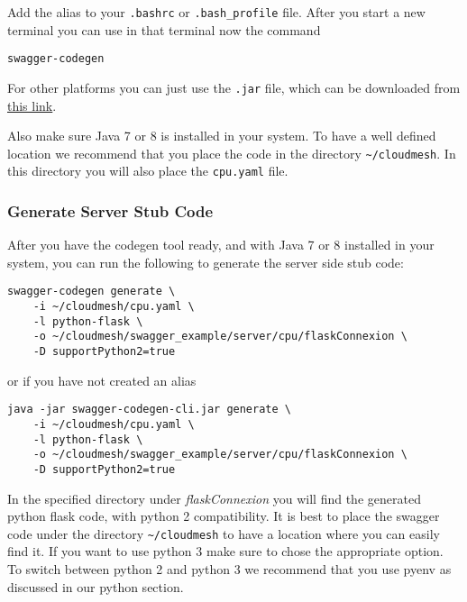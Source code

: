 Add the alias to your \verb|.bashrc| or \verb|.bash_profile| file. After you start a
new terminal you can use in that terminal now the command 

\begin{lstlisting}
swagger-codegen
\end{lstlisting}


For other platforms you can just use the \texttt{.jar} file, which can be downloaded
from
\href{https://oss.sonatype.org/content/repositories/releases/io/swagger/swagger-codegen-cli/2.3.1/swagger-codegen-cli-2.3.1.jar}{this
link}.

Also make sure Java 7 or 8 is installed in your system. To have a well
defined location we recommend that you place the code in the directory
\texttt{\textasciitilde{}/cloudmesh}. In this directory you will also
place the \texttt{cpu.yaml} file.

\subsubsection{Generate Server Stub
Code}\label{generate-server-stub-code}

After you have the codegen tool ready, and with Java 7 or 8 installed in
your system, you can run the following to generate the server side stub
code:

\begin{lstlisting}
swagger-codegen generate \
    -i ~/cloudmesh/cpu.yaml \
    -l python-flask \
    -o ~/cloudmesh/swagger_example/server/cpu/flaskConnexion \
    -D supportPython2=true
\end{lstlisting}

or if you have not created an alias 

\begin{lstlisting}
java -jar swagger-codegen-cli.jar generate \
    -i ~/cloudmesh/cpu.yaml \
    -l python-flask \
    -o ~/cloudmesh/swagger_example/server/cpu/flaskConnexion \
    -D supportPython2=true
\end{lstlisting}



In the specified directory under \emph{flaskConnexion} you will find the
generated python flask code, with python 2 compatibility. It is best to
place the swagger code under the directory \verb|~/cloudmesh|
to have a location where you can easily find it. If you want to use
python 3 make sure to chose the appropriate option. To switch between
python 2 and python 3 we recommend that you use pyenv as discussed in
our python section.

